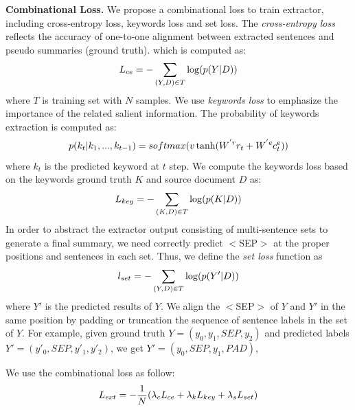 \textbf{Combinational Loss.} 
We propose a combinational loss to train extractor, including
cross-entropy loss, keywords loss and set loss.
The {\em cross-entropy loss} reflects the accuracy of one-to-one alignment between
extracted sentences and pseudo summaries (ground truth).
which is computed as:
\begin{equation}
\small
L_{ce} = - \sum_{(Y,D) \in T}{\log(p(Y|D))}
\end{equation}
where $T$ is training set with $N$ samples.
We use {\em keywords loss} to emphasize the importance of the related salient information.
The probability of keywords extraction is computed as: 
\begin{equation}
\small
p(k_t|k_1,...,k_{t-1}) = softmax(v \tanh(W^{'r} r_{t} + W^{'e} c_t^e)) 
\end{equation}
where $k_t$ is the predicted keyword at $t$ step.
We compute the keywords loss based on the keywords ground truth $K$ 
and source document $D$ as:
\begin{equation}
\small
L_{key} = - \sum_{(K,D) \in T}{\log(p(K|D))}
\end{equation}
In order to abstract the extractor output consisting of multi-sentence sets
to generate a final summary,
we need correctly predict $<$SEP$>$ at the proper positions
and sentences in each set.
Thus, we define the {\em set loss} function as
\begin{equation}
\small
l_{set} = -  \sum_{(Y,D) \in T}{\log(p(Y'|D))}
\end{equation}
where $Y'$ is the predicted results of $Y$.
We align the $<$SEP$>$ of $Y$ and $Y'$
in the same position by padding or truncation 
the sequence of sentence labels in the set of $Y$.
For example, given ground truth $Y = (y_0,y_1,SEP,y_2)$ 
and predicted labels $Y' = (y'_0,SEP,y'_1,y'_2)$, we get
$Y' = (y_0,SEP,y_1,PAD)$, 

We use the combinational loss as follow:
\begin{equation}
\label{func:loss}
\small
L_{ext} = - \frac{1}{N} (\lambda_{c}L_{ce} + \lambda_{k}L_{key} + \lambda_{s}L_{set})
\end{equation}



